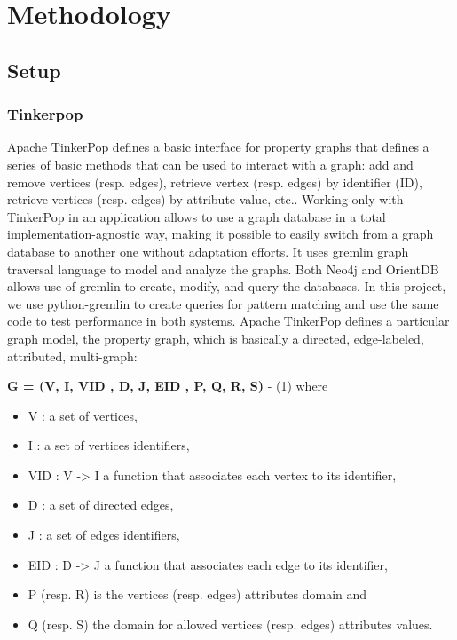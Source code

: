 
\section{Methodology}

\subsection{Setup}

\subsubsection{Tinkerpop}

Apache TinkerPop defines a basic interface for property graphs that defines a series of basic methods that can be used to interact with a graph: add and remove vertices (resp. edges), retrieve vertex (resp. edges) by identifier (ID), retrieve vertices (resp. edges) by attribute value, etc.. Working only with TinkerPop in an application allows to use a graph database in a total implementation-agnostic way, making it possible to easily switch from a graph database to another one without adaptation efforts. It uses gremlin graph traversal language to model and analyze the graphs. Both Neo4j and OrientDB allows use of gremlin to create, modify, and query the databases. In this project, we use python-gremlin to create queries for pattern matching and use the same code to test performance in both systems. Apache TinkerPop defines a particular graph model, the property graph, which is basically a directed, edge-labeled, attributed, multi-graph:

\textbf{G = (V, I, VID , D, J, EID , P, Q, R, S)} - (1)
where 
\begin{itemize}
\item V : a set of vertices, 
\item I : a set of vertices identifiers, 
\item VID : V -> I a function that associates each vertex to its identifier, 
\item D : a set of directed edges, 
\item J : a set of edges identifiers, 
\item EID : D -> J a function that associates each edge to its identifier, 
\item P (resp. R) is the vertices (resp. edges) attributes domain and 
\item Q (resp. S) the domain for allowed vertices (resp. edges) attributes values.
\end{itemize}


